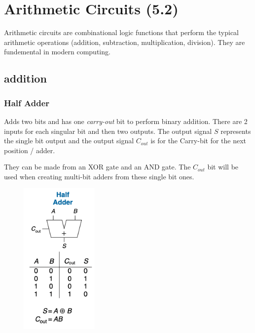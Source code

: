\documentclass[12pt]{report}
\begin{document}
\chapter{Arithmetic Circuits (5.2)}
Arithmetic circuits are combinational logic functions that perform the typical arithmetic operations (addition, subtraction, multiplication, division). 
They are fundemental in modern computing. 

\section{addition}
\subsection{Half Adder}

\noindent Adds two bits and has one \textit{carry-out} bit to perform binary addition. There are 2 inputs for each singular bit and then two outputs.
The output signal $S$ represents the single bit output and the output signal $C_{out}$ is for the Carry-bit for the next position / adder.
\medskip

\noindent They can be made from an XOR gate and an AND gate. The $C_{out}$ bit will be used when creating multi-bit adders from these single bit ones. 
\begin{figure}[h!]
  \centering
  \includegraphics[width=1.5in]{half-adder.png}
\end{figure}
\pagebreak
\end{document}
